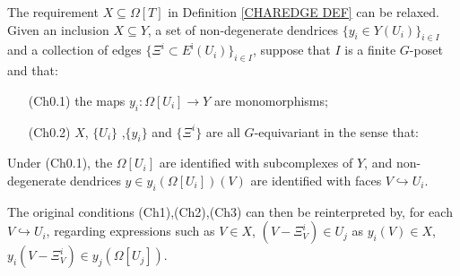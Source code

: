 \documentclass[a4paper,10pt,draft]{article}%
\begin{document}
\begin{remark}\label{CHAREDGE2 REM}
The requirement $X \subseteq \Omega[T]$ in Definition \ref{CHAREDGE DEF} can be relaxed.
Given an inclusion $X \subseteq Y$,
a set of non-degenerate dendrices
$\{y_i \in Y(U_i)\}_{i \in I}$
and a collection of edges
$\{\Xi^i \subset E^{\mathsf{i}}(U_i)\}_{i \in I}$, 
suppose that $I$ is a finite $G$-poset and that:
\begin{itemize}
	\item[(Ch0.1)] the maps $y_i \colon \Omega[U_i] \to Y$ are monomorphisms;
	\item[(Ch0.2)] $X$, $\{U_i\}$ ,$\{y_i\}$ and $\{\Xi^i\}$
	are all $G$-equivariant in the sense that:
\end{itemize}
Under (Ch0.1),
the $\Omega[U_i]$ are identified with subcomplexes of $Y$,
and non-degenerate dendrices $y \in y_i(\Omega[U_i])(V)$
are identified with faces $V \hookrightarrow U_i$.

The original conditions (Ch1),(Ch2),(Ch3) can then be reinterpreted by, 
for each $V \hookrightarrow U_i$, 
regarding expressions such as $V \in X$, $(V-\Xi^i_V)\in U_j$
as $y_i(V) \in X$, $y_i(V-\Xi^i_V) \in y_j(\Omega[U_j])$.


\end{remark}
\end{document}
